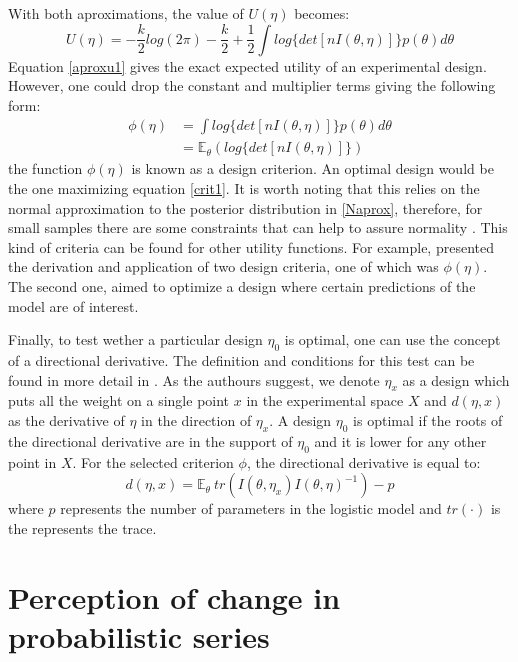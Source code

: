 \documentclass[preprint,review,12pt]{elsarticle}
\begin{document}
With both aproximations, the value of $U(\eta)$ becomes:
\begin{equation}
U(\eta)=-\frac{k}{2}log(2\pi)-\frac{k}{2}+\frac{1}{2} \int log \{det[nI(\theta,\eta)]\} p(\theta) d\theta
\label{aproxu1}
\end{equation}
Equation \ref{aproxu1} gives the exact expected utility of an experimental design. However, one could drop the constant and multiplier terms giving the following form:
\begin{align}
\phi(\eta) & = \int log \{det[nI(\theta,\eta)]\} p(\theta) d\theta \\
           & = \mathbb{E}_\theta \left( log\{det[nI(\theta,\eta)]\} \right)
\label{crit1}
\end{align}
the function $\phi(\eta)$ is known as a design criterion. An optimal design would be the one maximizing equation \ref{crit1}. It is worth noting that this relies on the normal approximation to the posterior distribution in \ref{Naprox}, therefore, for small samples there are some constraints that can help to assure normality \citep[see][]{CLCH2002}. This kind of criteria can be found for other utility functions. For example, \citet{chalar1989} presented the derivation and application of two design criteria, one of which was $\phi(\eta)$. The second one, aimed to optimize a design where certain predictions of the model are of interest. 

Finally, to test wether a particular design $\eta_0$ is optimal, one can use the concept of a directional derivative. The definition and conditions for this test can be found in more detail in \citet{chalar1989}. As the authours suggest, we denote $\eta_x$ as a design which puts all the weight on a single point $x$ in the experimental space $X$ and $d(\eta,x)$ as the derivative of $\eta$ in the direction of $\eta_x$. A design $\eta_0$ is optimal if the roots of the directional derivative are in the support of $\eta_0$ and it is lower for any other point in $X$. For the selected criterion $\phi$, the directional derivative is equal to:
\begin{equation}
d(\eta,x)=\mathbb{E}_\theta\ tr \left( I(\theta,\eta_x) I(\theta,\eta)^{-1}\right)-p
\end{equation}
where $p$ represents the number of parameters in the logistic model and $tr(\cdot)$ is the represents the trace.



\section{Perception of change in probabilistic series}
\label{S:2}
\end{document}
